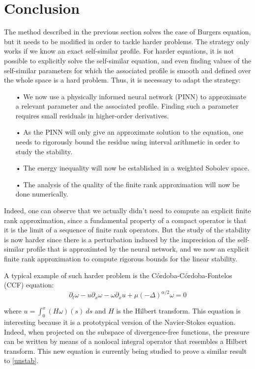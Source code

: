 \documentclass[11pt,a4paper]{article}
\begin{document}
\section{Conclusion}
The method described in the previous section solves the case of Burgers equation, but it needs to be modified in order to tackle harder problems. The strategy only works if we know an exact self-similar profile. For harder equations, it is not possible to explicitly solve the self-similar equation, and even finding values of the self-similar parameters for which the associated profile is smooth and defined over the whole space is a hard problem. Thus, it is necessary to adapt the strategy: 
\begin{itemize}
\item[•] We now use a physically informed neural network (PINN) to approximate a relevant parameter and the associated profile. Finding such a parameter requires small residuals in higher-order derivatives.
\item[•] As the PINN will only give an approximate solution to the equation, one needs to rigorously bound the residue using interval arithmetic in order to study the stability.
\item[•] The energy inequality will now be established in a weighted Sobolev space.
\item[•] The analysis of the quality of the finite rank approximation will now be done numerically.
\end{itemize}

Indeed, one can observe that we actually didn't need to compute an explicit finite rank approximation, since a fundamental property of a compact operator is that it is the limit of a sequence of finite rank operators. But the study of the stability is now harder since there is a perturbation induced by the imprecision of the self-similar profile that is approximted by the neural network, and we now an explicit finite rank approximation to compute rigorous bounds for the linear stability.

A typical example of such harder problem is the Córdoba-Córdoba-Fontelos (CCF) equation:
\[
\partial_t \omega - u \partial_x \omega - \omega \partial_x u + \mu(-\Delta)^{\alpha/2} \omega = 0
\]

where $u = \int_0^x (H\omega)(s)~ds$ and $H$ is the Hilbert transform. This equation is interesting because it is a prototypical version of the Navier-Stokes equation. Indeed, when projected on the subspace of divergence-free functions, the pressure can be written by means of a nonlocal integral operator that resembles a Hilbert transform. This new equation is currently being studied to prove a similar result to \ref{unstab}.
\end{document}
